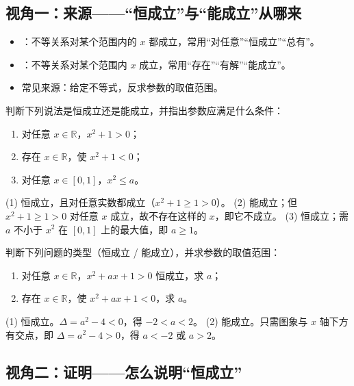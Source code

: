 \begin{explore}
\subsection{视角一：来源——“恒成立”与“能成立”从哪来}

\begin{itemize}
  \item {}：不等关系对某个范围内的 $x$ 都成立，常用“对任意”“恒成立”“总有”。
  \item {}：不等关系对某个范围内 $x$ 成立，常用“存在”“有解”“能成立”。
  \item 常见来源：给定不等式，反求参数的取值范围。
\end{itemize}

\begin{example}
判断下列说法是恒成立还是能成立，并指出参数应满足什么条件：
\begin{enumerate}
  \item 对任意 $x\in\mathbb{R}$，$x^2+1>0$；
  \item 存在 $x\in\mathbb{R}$，使 $x^2+1<0$；
  \item 对任意 $x\in[0,1]$，$x^2\leq a$。
\end{enumerate}
\end{example}
\begin{solution}
(1) 恒成立，且对任意实数都成立（$x^2+1\geq1>0$）。
(2) 能成立；但 $x^2+1\geq1>0$ 对任意 $x$ 成立，故不存在这样的 $x$，即它不成立。
(3) 恒成立；需 $a$ 不小于 $x^2$ 在 $[0,1]$ 上的最大值，即 $a\geq1$。
\end{solution}

\begin{problem}
判断下列问题的类型（恒成立 / 能成立），并求参数的取值范围：
\begin{enumerate}
  \item 对任意 $x\in\mathbb{R}$，$x^2+ax+1>0$ 恒成立，求 $a$；
  \item 存在 $x\in\mathbb{R}$，使 $x^2+ax+1<0$，求 $a$。
\end{enumerate}
\end{problem}
\begin{solution}
(1) 恒成立。$\Delta=a^2-4<0$，得 $-2<a<2$。
(2) 能成立。只需图象与 $x$ 轴下方有交点，即 $\Delta=a^2-4>0$，得 $a<-2$ 或 $a>2$。
\end{solution}

\subsection{视角二：证明——怎么说明“恒成立”}


\end{explore}
